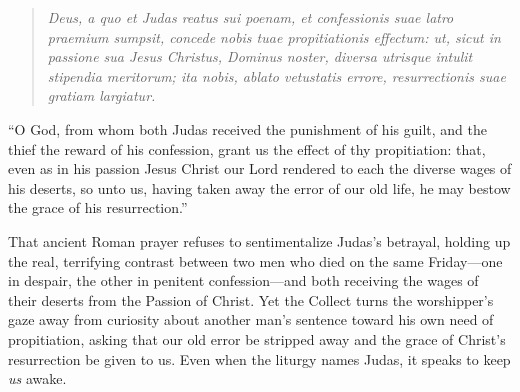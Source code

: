 \begin{quote}
\textit{Deus, a quo et Judas reatus sui poenam, et confessionis suae latro praemium sumpsit, concede nobis tuae propitiationis effectum: ut, sicut in passione sua Jesus Christus, Dominus noster, diversa utrisque intulit stipendia meritorum; ita nobis, ablato vetustatis errore, resurrectionis suae gratiam largiatur.}
\end{quote}

``O God, from whom both Judas received the punishment of his guilt, and the thief the reward of his confession, grant us the effect of thy propitiation: that, even as in his passion Jesus Christ our Lord rendered to each the diverse wages of his deserts, so unto us, having taken away the error of our old life, he may bestow the grace of his resurrection.''

That ancient Roman prayer refuses to sentimentalize Judas's betrayal, holding up the real, terrifying contrast between two men who died on the same Friday---one in despair, the other in penitent confession---and both receiving the wages of their deserts from the Passion of Christ. Yet the Collect turns the worshipper's gaze away from curiosity about another man's sentence toward his own need of propitiation, asking that our old error be stripped away and the grace of Christ's resurrection be given to us. Even when the liturgy names Judas, it speaks to keep \textit{us} awake.
